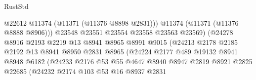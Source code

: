 \begin{lexlean}{RustStd}
\begin{coremodule}
                                          @22612
                                          @11374
                                          (@11371 (@11376 @8898 @2831)))
                                        @11374
                                        (@11371 (@11376 @8888 @8906)))
                                      @23548
                                      @23551
                                      @23554
                                      @23558
                                      @23563
                                      @23569)
                                    (@24278
                                      @8916
                                      @2193
                                      @2219
                                      @13
                                      @8941
                                      @8965
                                      @8991
                                      @9015
                                      (@24213
                                        @2178
                                        @2185
                                        @2192
                                        @13
                                        @8941
                                        @8950
                                        @2831
                                        @8965
                                        (@24224
                                          @2177
                                          @489
                                          @19132
                                          @8941
                                          @8948
                                          @6182
                                          (@24233
                                            @2176
                                            @53
                                            @55
                                            @4647
                                            @8940
                                            @8947
                                            @2819
                                            @8921
                                            @2825
                                            @22685
                                            (@24232
                                              @2174
                                              @103
                                              @53
                                              @16
                                              @8937
                                              @2831

\end{coremodule}
\end{lexlean}
